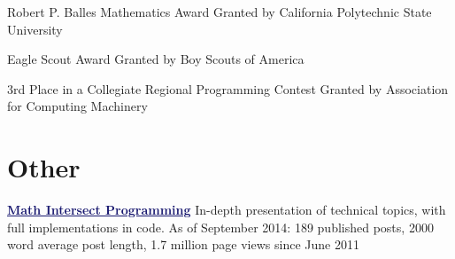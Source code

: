 \documentclass[11pt]{moderncv}
\begin{document}
         {Robert P. Balles Mathematics Award}
{}
      {Granted by California Polytechnic State University}
      {}
      {}

         {Eagle Scout Award}
{}
      {Granted by Boy Scouts of America}
      {}
      {}

         {3rd Place in a Collegiate Regional Programming Contest}
{}
      {Granted by Association for Computing Machinery}
      {}
      {}


   \section{Other}
         {\href{http://jeremykun.com}{\textcolor{MidnightBlue}{\underline{\textbf{Math Intersect Programming}}}}}
      {}
      {In-depth presentation of technical topics, with full implementations in code. As of September 2014: 189 published posts, 2000 word average post length, 1.7 million page views since June 2011}
      {}
      {}
\end{document}
